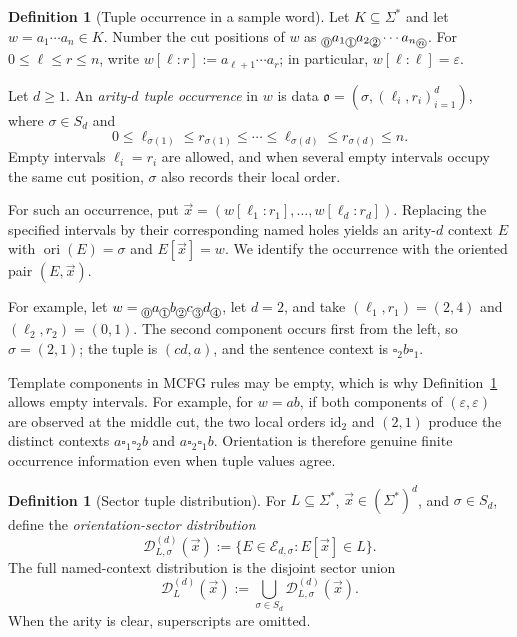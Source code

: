 \documentclass[11pt,a4paper]{article}
\numberwithin{equation}{section}
\theoremstyle{plain}
\theoremstyle{definition}
\newtheorem{definition}[theorem]{Definition}
\theoremstyle{remark}
\newcommand{\D}{\mathcal{D}}
\newcommand{\tuple}[1]{\vec{#1}}
\newcommand{\blank}{\square}
\newcommand{\eps}{\varepsilon}
\newcommand{\cutpos}[1]{%
  \raisebox{-0.7ex}{%
    \tikz[baseline=(char.base)]{%
      \node[draw,circle,inner sep=0.4pt,font=\scriptsize]
        (char) {\ensuremath{#1}};%
    }%
  }%
}
\begin{document}
\begin{definition}[Tuple occurrence in a sample word]
\label{def:tuple-occurrence}
Let \(K\subseteq\Sigma^*\) and let \(w=a_1\cdots a_n\in K\).
Number the cut positions of \(w\) as
\(\cutpos{0}a_1\cutpos{1}a_2\cutpos{2}\cdots a_n\cutpos{n}\).
For \(0\le\ell\le r\le n\), write
\(w[\ell:r]:=a_{\ell+1}\cdots a_r\); in particular,
\(w[\ell:\ell]=\eps\).

Let \(d\ge1\).  An \emph{arity-\(d\) tuple occurrence} in \(w\) is data
\(\mathfrak{o}=(\sigma,(\ell_i,r_i)_{i=1}^d)\), where \(\sigma\in S_d\) and
\[
  0\le\ell_{\sigma(1)}\le r_{\sigma(1)}
  \le\cdots\le\ell_{\sigma(d)}\le r_{\sigma(d)}\le n.
\]
Empty intervals \(\ell_i=r_i\) are allowed, and when several empty intervals
occupy the same cut position, \(\sigma\) also records their local order.

For such an occurrence, put
\(\tuple x=(w[\ell_1:r_1],\ldots,w[\ell_d:r_d])\).
Replacing the specified intervals by their corresponding named holes yields an
arity-\(d\) context \(E\) with \(\operatorname{ori}(E)=\sigma\) and
\(E[\tuple x]=w\).  We identify the occurrence with the oriented pair
\((E,\tuple x)\).

For example, let
\(w=\cutpos{0}a\cutpos{1}b\cutpos{2}c\cutpos{3}d\cutpos{4}\), let \(d=2\),
and take \((\ell_1,r_1)=(2,4)\) and \((\ell_2,r_2)=(0,1)\).
The second component occurs first from the left, so \(\sigma=(2,1)\); the
tuple is \((cd,a)\), and the sentence context is \(\blank_2b\blank_1\).
\end{definition}

Template components in MCFG rules may be empty, which is why
Definition~\ref{def:tuple-occurrence} allows empty intervals.  For example,
for \(w=ab\), if both components of \((\eps,\eps)\) are observed at the
middle cut, the two local orders \(\mathrm{id}_2\) and \((2,1)\) produce the distinct
contexts \(a\blank_1\blank_2b\) and \(a\blank_2\blank_1b\).  Orientation is
therefore genuine finite occurrence information even when tuple values agree.

\begin{definition}[Sector tuple distribution]
\label{def:tuple-distribution}
For \(L\subseteq\Sigma^*\), \(\tuple x\in(\Sigma^*)^d\), and
\(\sigma\in S_d\), define the \emph{orientation-sector distribution}
\[
  \D_{L,\sigma}^{(d)}(\tuple x)
  :=
  \{E\in\mathcal E_{d,\sigma}:E[\tuple x]\in L\}.
\]
The full named-context distribution is the disjoint sector union
\[
  \D_L^{(d)}(\tuple x)
  :=\bigcup_{\sigma\in S_d}\D_{L,\sigma}^{(d)}(\tuple x).
\]
When the arity is clear, superscripts are omitted.
\end{definition}
\end{document}
